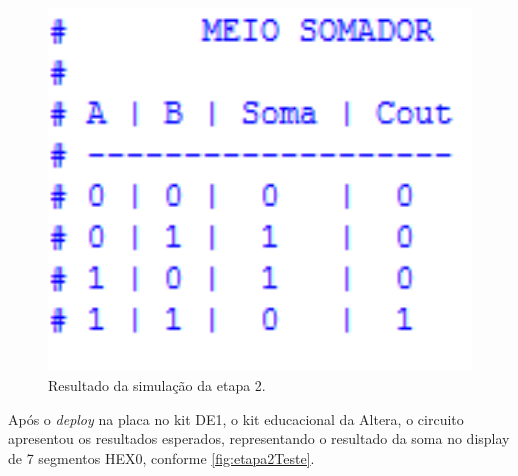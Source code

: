 		\begin{figure}[H]
		    \centering
			\caption{\label{fig:etapa2Simulacao}Resultado da simulação da etapa 2.}
			\includegraphics[width=1\textwidth]{img/etapa2/simulacaoMeioSomador}
		\end{figure}

		Após o \textit{deploy} na placa no kit DE1, o kit educacional da Altera, o circuito apresentou
		 os resultados esperados, representando o resultado da soma no display de 7 segmentos HEX0,
		 conforme \autoref{fig:etapa2Teste}.

